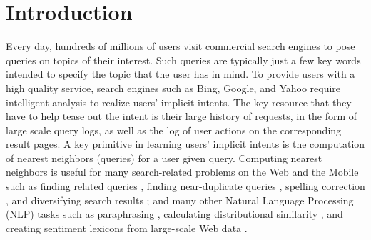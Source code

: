 
 \section{Introduction}
Every day, 
hundreds of millions of users visit commercial search engines to pose
queries on topics of their interest.  
Such queries are typically just a few key words intended to specify
the topic that the user has in mind. 
To provide users with a high quality service, 
search engines such as Bing, Google, and Yahoo require
intelligent analysis to realize users' implicit intents.
The key resource that they have to help tease out the intent is
their large history of requests, in the form of large scale query logs, as well
as the log of user actions on the corresponding result pages. 
A key primitive in 
learning users' implicit intents is the computation of 
nearest neighbors (queries) for a user given query. 
Computing nearest neighbors is useful for 
many search-related problems on the Web and the Mobile such as 
finding related queries \cite{Jones06WWW,Jain11SIGIR,Song12WSDM}, 
finding near-duplicate queries \cite{leeCIKM11}, spelling correction \cite{ahmadEMNLP05,liSIGIR12},  
and diversifying search results \cite{Song11SIGIR}; and many other Natural Language Processing (NLP) tasks   
such as paraphrasing \cite{petrovicNAACL12,ganitkevitch13Paraphrase}, 
calculating distributional similarity \cite{ravichandran05,agirre09,turneyVector10}, and creating sentiment lexicons from large-scale Web data \cite{velikovich10}.   

